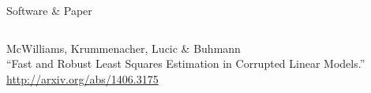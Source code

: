 \documentclass[final,t,english,professionalfonts, xcolor=dvipsnames]{beamer}
\begin{document}
\begin{frame}{}
{\begin{minipage}[c]{0.96\linewidth}
\begin{columns}[t]
\begin{column}{.33\linewidth}
\begin{alertblock}{Software \& Paper}
\begin{columns}[c]
McWilliams, Krummenacher, Lucic \& Buhmann\\ ``Fast and Robust Least Squares Estimation in Corrupted Linear Models.''
\url{http://arxiv.org/abs/1406.3175}
\end{columns}
\end{alertblock}

\end{column}
\end{columns}
\end{minipage}
}%
\end{frame}
\end{document}
